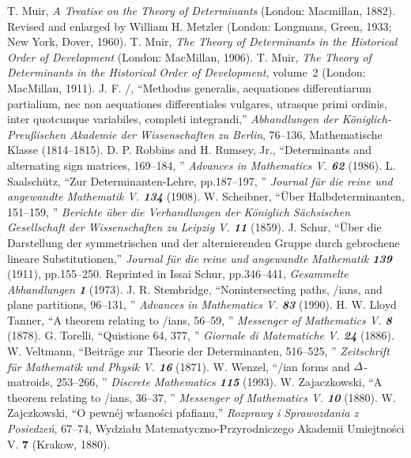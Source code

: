 \documentclass[a4paper,12pt]{article}
\begin{document}
\begin{thebibliography}{99}
T. Muir, {\sl A Treatise on the Theory of Determinants\/} (London: Macmillan, 1882). Revised and enlarged by William H. Metzler (London: Longmans, Green, 1933; New York, Dover, 1960).
T. Muir, {\sl The Theory of Determinants in the Historical Order of Development\/} (London: MacMillan, 1906).
T. Muir, {\sl The Theory of Determinants in the Historical Order of Development}, volume~2 (London: MacMillan, 1911).
 J. F. \Pfaff/, ``Methodus generalis, aequationes differentiarum partialium, nec non aequationes differentiales vulgares, utrasque primi ordinis, inter quotcunque variabiles, completi integrandi,'' {\sl Abhandlungen der K\"oniglich-Preu{\ss}ischen Akademie der Wissenschaften zu Berlin}, 76--136,  Mathematische Klasse (1814--1815).
D. P. Robbins and H. Rumsey, Jr., ``Determinants and alternating sign matrices, 169--184, '' {\sl Advances in Mathematics\/ V. \bf 62} (1986).
L. Saalsch\"utz, ``Zur Determinanten-Lehre, pp.187--197, '' {\sl Journal f\"ur die reine und angewandte Mathematik\/ V. \bf 134} (1908).
 W. Scheibner, ``\"Uber Halbdeterminanten, 151--159, '' {\sl Berichte \"uber die Verhandlungen der K\"oniglich S\"achsischen Gesellschaft der Wissenschaften zu Leipzig\/ V. \bf 11} (1859).
 J. Schur, ``\"Uber die Darstellung der symmetrischen und der alternierenden Gruppe durch gebrochene lineare Substitutionen,'' {\sl Journal f\"ur die reine und angewandte Mathematik\/ \bf139} (1911), pp.155--250. Reprinted in Issai Schur, pp.346--441,  {\sl Gesammelte Abhandlungen\/ \bf1} (1973).
J. R. Stembridge, ``Nonintersecting paths, \Pfaff/ians, and plane  partitions, 96--131, '' {\sl Advances in Mathematics\/ V. \bf 83} (1990).
 H. W. Lloyd Tanner, ``A theorem relating to \Pfaff/ians, 56--59, '' {\sl Messenger of Mathematics\/ V. \bf 8} (1878).
G. Torelli, ``Quistione 64, 377, '' {\sl Giornale di Matematiche\/ V. \bf 24} (1886).
 W. Veltmann, ``Beitr\"age zur Theorie der Determinanten, 516--525, '' {\sl Zeitschrift f\"ur Mathematik und Physik\/ V. \bf 16} (1871).
W. Wenzel, ``\Pfaff/ian forms and $\mit\Delta$-matroids, 253--266, '' {\sl Discrete Mathematics\/ \bf115} (1993).
 W. Zajaczkowski, ``A theorem relating to \Pfaff/ians, 36--37, ''  {\sl Messenger of Mathematics\/ V. \bf 10} (1880).
 W. Zajczkowski, ``O pewn\'ej w{\l}asno\'sci pfafianu,''  {\sl Rozprawy i Sprawozdania z Posiedze\'n}, 67--74,  Wydzia{\l}u  Matematyczno-Przyrodniczego Akademii Umiejtno\'sci {V. \bf 7} (Krakow, 1880).
\bye
\end{thebibliography}
\end{document}
